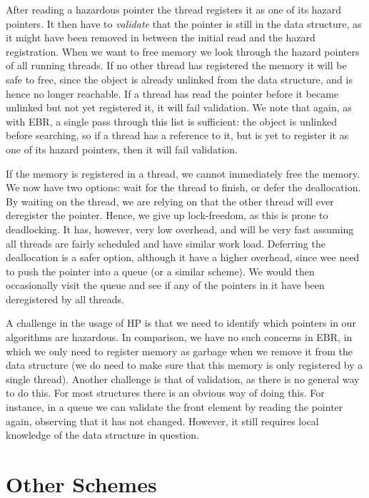 \documentclass[b5paper]{report}
\begin{document}
After reading a hazardous pointer the thread registers it as one of its hazard
pointers. It then have to \emph{validate} that the pointer is still in the data
structure, as it might have been removed in between the initial read and the
hazard registration. When we want to free memory we look through the hazard
pointers of all running threads. If no other thread has registered the memory it
will be safe to free, since the object is already unlinked from the data
structure, and is hence no longer reachable. If a thread has read the pointer
before it became unlinked but not yet registered it, it will fail validation.
We note that again, as with EBR, a single pass through this list is sufficient:
the object is unlinked before searching, so if a thread has a reference to it,
but is yet to register it as one of its hazard pointers, then it will fail
validation.

If the memory is registered in a thread, we cannot immediately free the memory.
We now have two options: wait for the thread to finish, or defer the
deallocation.  By waiting on the thread, we are relying on that the other thread
will ever deregister the pointer. Hence, we give up lock-freedom, as this is
prone to deadlocking. It has, however, very low overhead, and will be very fast
assuming all threads are fairly scheduled and have similar work load.  Deferring
the deallocation is a safer option, although it have a higher overhead, since
wee need to push the pointer into a queue (or a similar scheme). We would then
occasionally visit the queue and see if any of the pointers in it have been
deregistered by all threads.

A challenge in the usage of HP is that we need to identify which pointers in our
algorithms are hazardous. In comparison, we have no such concerns in EBR, in
which we only need to register memory as garbage when we remove it from the data
structure (we do need to make sure that this memory is only registered by a
single thread). Another challenge is that of validation, as there is no general
way to do this. For most structures there is an obvious way of doing this. For
instance, in a queue we can validate the front element by reading the
 pointer again, observing that it has not changed. However, it still
requires local knowledge of the data structure in question.

\section{Other Schemes\label{sec:other-schemes}}
\end{document}
